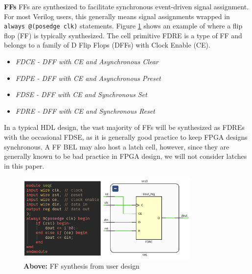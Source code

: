 \documentclass[twocolumn]{article}
\begin{document}
    \textbf{FFs} \quad
        FFs are synthesized to facilitate synchronous event-driven signal assignment. 
        For most Verilog users, this generally means signal assignments wrapped in \texttt{always @(posedge clk)} statements. 
        Figure \ref{fig:ff_synthesis} shows an example of where a flip flop (FF) is typically synthesized. 
        The cell primitive FDRE is a type of FF and belongs to a family of D Flip Flops (DFFs) with Clock Enable (CE). 
        \begin{itemize}
            \item \emph{FDCE - DFF with CE and Asynchronous Clear}
            \item \emph{FDPE - DFF with CE and Asynchronous Preset}
            \item \emph{FDSE - DFF with CE and Synchronous Set}
            \item \emph{FDRE - DFF with CE and Synchronous Reset}
        \end{itemize}
        In a typical HDL design, the vast majority of FFs will be synthesized as FDREs with the occasional FDSE, as it is generally good practice to keep FPGA designs synchronous. 
        A FF BEL may also host a latch cell, however, since they are generally known to be bad practice in FPGA design, we will not consider latches in this paper. 
        \begin{figure}[]
            \centering
            \includegraphics[width=9.0cm]{figures/ff_synthesis.png}
            \caption{\textbf{Above:} FF synthesis from user design}
            \label{fig:ff_synthesis}
        \end{figure}
\end{document}
